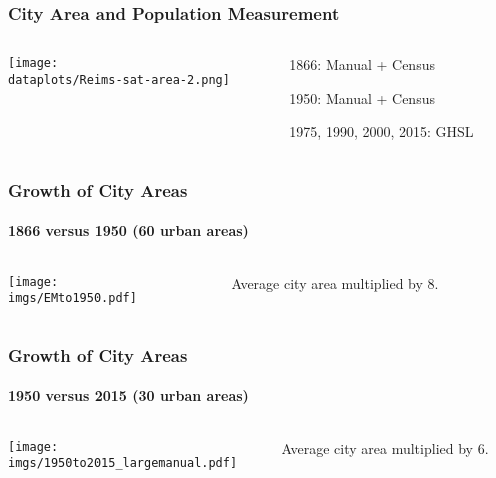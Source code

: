 \documentclass[aspectratio=169]{beamer}
\begin{document}
\begin{frame}
\frametitle{City Area and Population Measurement}
\begin{columns}

\begin{column}{0.7\textwidth}
	\begin{adjustbox}{center}
	\texttt{[image: \\dataplots/Reims-sat-area-2.png]}\end{adjustbox}
	\end{column}
\begin{column}{0.3\textwidth}
\begin{midi}
\item 1866: Manual + Census
\item 1950: Manual + Census
\item 1975, 1990, 2000, 2015: GHSL
\end{midi}
	
\end{column}
\end{columns}
\end{frame}

\begin{v75mins}

\begin{frame}
\frametitle{Growth of City Areas}
\framesubtitle{1866 versus 1950 (60 urban areas)}

\begin{columns}
\begin{column}{0.8\textwidth}
	\begin{adjustbox}{right}
	\texttt{[image: \\imgs/EMto1950.pdf]}\end{adjustbox}
\end{column}
\begin{column}{0.3\textwidth}
\begin{midi}
\item Average city area multiplied by 8.
\end{midi}
\end{column}
\end{columns}
\end{frame}

\begin{frame}
\frametitle{Growth of City Areas}
\framesubtitle{1950 versus 2015 (30 urban areas)}\begin{columns}
\begin{column}{0.8\textwidth}
	\begin{adjustbox}{right}
	\texttt{[image: \\imgs/1950to2015\_largemanual.pdf]}\end{adjustbox}
\end{column}
\begin{column}{0.3\textwidth}
\begin{midi}
\item Average city area multiplied by 6.
\end{midi}
\end{column}
\end{columns}
\end{frame}\end{v75mins}
\end{document}
